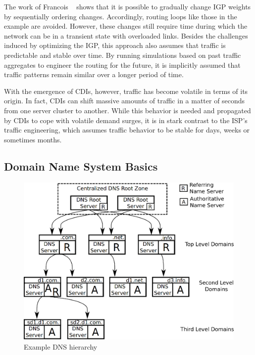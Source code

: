 The work of Francois \etal~\cite{transient-IGP} shows that it is possible to
gradually change IGP weights by sequentially ordering changes. Accordingly,
routing loops like those in the example are avoided. However, these changes
still require time during which the network can be in a transient state with
overloaded links. Besides the challenges induced by optimizing the IGP, this
approach also assumes that traffic is predictable and stable over time. By
running simulations based on past traffic aggregates to engineer the routing
for the future, it is implicitly assumed that traffic patterns remain similar
over a longer period of time.

With the emergence of CDIs, however, traffic has become volatile in terms of
its origin. In fact, CDIs can shift massive amounts of traffic in a matter of
seconds from one server cluster to another. While this behavior is needed and
propagated by CDIs to cope with volatile demand surges, it is in stark contrast
to the ISP's traffic engineering, which assumes traffic behavior to be stable
for days, weeks or sometimes months.


\subsection{Domain Name System Basics}\label{sec:DNS}

\begin{figure}[tbp] \begin{center}
\includegraphics[width=0.8\linewidth]{figures/DNSHierarchy.eps} 
\end{center}
\caption{Example DNS hierarchy} 
\label{fig:DNS-Hierarchy} 
\end{figure}

